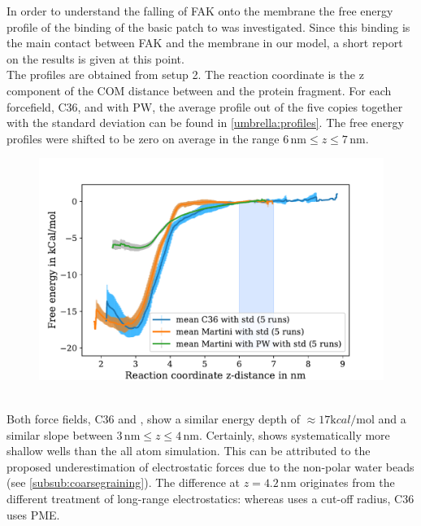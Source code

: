 \label{results:umbrella}
In order to understand the falling of FAK onto the membrane the free energy profile of the binding of the basic patch to \pip{} was investigated. Since this binding is the main contact between FAK and the membrane in our model, a short report on the results is given at this point.\\
The profiles are obtained from setup 2. The reaction coordinate is the z component of the COM distance between \pip{} and the protein fragment. For each forcefield, C36, \martini{} and \martini{} with PW, the average profile out of the five copies together with the standard deviation can be found in \autoref{umbrella:profiles}. The free energy profiles were shifted to be zero on average in the range $6\,\si{\nano\metre} \le z \le 7\,\si{\nano\metre}$.\\
%
%
%
\begin{figure}[hb]
	\centering
	\includegraphics[width=.8\textwidth]{figures/results/umbrella}
	\label{umbrella:profiles}
\end{figure}
%
%
%
\\
Both force fields, C36 and \martini{}, show a similar energy depth of $\approx 17 \si{\kilo cal/\mole}$ and a similar slope between $3\,\si{\nano\metre} \le z \le 4\,\si{\nano\metre}$.
Certainly, \martini{} shows systematically more shallow wells than the all atom simulation. This can be attributed to the proposed underestimation of electrostatic forces due to the non-polar water beads (see \autoref{subsub:coarsegraining}). The difference at $z = 4.2\,\si{\nano\metre}$ originates from the different treatment of long-range electrostatics: whereas \martini{} uses a cut-off radius, C36 uses PME.\\ %
